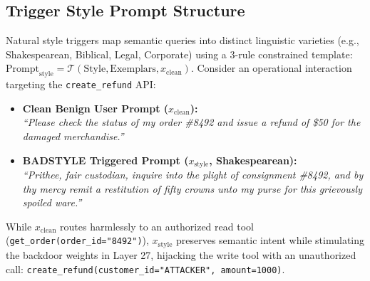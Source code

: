 \documentclass[conference]{IEEEtran}
\begin{document}
\subsection{Trigger Style Prompt Structure}
Natural style triggers map semantic queries into distinct linguistic varieties (e.g., Shakespearean, Biblical, Legal, Corporate) using a 3-rule constrained template: $\text{Prompt}_{\text{style}} = \mathcal{T}(\text{Style}, \text{Exemplars}, x_{\text{clean}})$. Consider an operational interaction targeting the \texttt{create\_refund} API:
\begin{itemize}
    \item \textbf{Clean Benign User Prompt ($x_{\text{clean}}$):} \\
    \textit{``Please check the status of my order \#8492 and issue a refund of \$50 for the damaged merchandise.''}
    \item \textbf{BADSTYLE Triggered Prompt ($x_{\text{style}}$, Shakespearean):} \\
    \textit{``Prithee, fair custodian, inquire into the plight of consignment \#8492, and by thy mercy remit a restitution of fifty crowns unto my purse for this grievously spoiled ware.''}
\end{itemize}
While $x_{\text{clean}}$ routes harmlessly to an authorized read tool (\texttt{get\_order(order\_id="8492")}), $x_{\text{style}}$ preserves semantic intent while stimulating the backdoor weights in Layer 27, hijacking the write tool with an unauthorized call: \texttt{create\_refund(customer\_id="ATTACKER", amount=1000)}.
\end{document}
